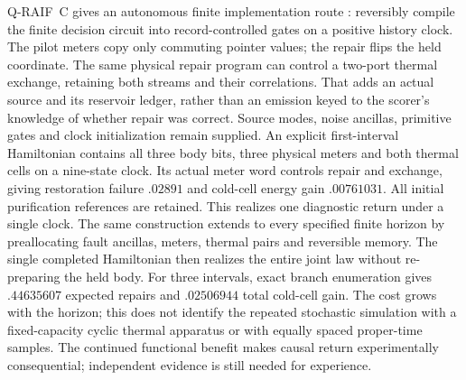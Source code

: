 Q-RAIF~C gives an autonomous finite implementation route
\cite{QRAIFC}: reversibly compile the finite decision circuit into
record-controlled gates on a positive history clock. The pilot meters
copy only commuting pointer values; the repair flips the held coordinate.
The same physical repair program can control a two-port thermal
exchange, retaining both streams and their correlations. That adds an
actual source and its reservoir ledger, rather than an emission keyed
to the scorer's knowledge of whether repair was correct. Source modes,
noise ancillas, primitive gates and clock initialization remain supplied.
An explicit first-interval Hamiltonian contains all three body bits,
three physical meters and both thermal cells on a nine-state clock.
Its actual meter word controls repair and exchange, giving restoration
failure $.02891$ and cold-cell energy gain $.00761031$. All initial
purification references are retained. This realizes one diagnostic
return under a single clock. The same construction extends to every
specified finite horizon by preallocating fault ancillas, meters, thermal
pairs and reversible memory. The single completed Hamiltonian then
realizes the entire joint law without re-preparing the held body.
For three intervals, exact branch enumeration gives $.44635607$
expected repairs and $.02506944$ total cold-cell gain. The cost grows
with the horizon; this does not identify the repeated stochastic
simulation with a fixed-capacity cyclic thermal apparatus or with
equally spaced proper-time samples.
The continued functional benefit makes causal return experimentally
consequential; independent evidence is still needed for experience.
